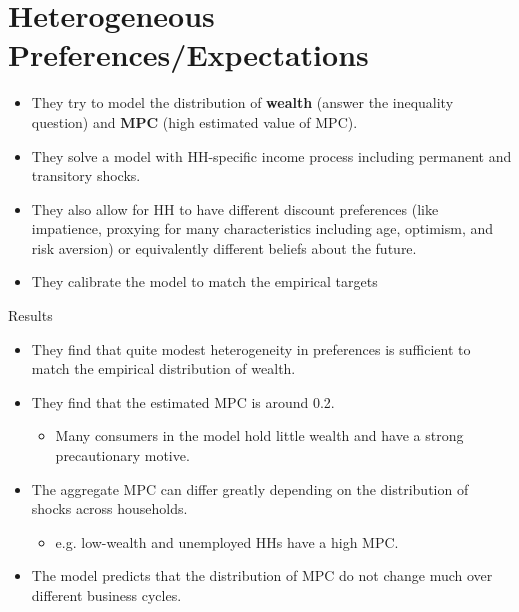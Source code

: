 \documentclass{beamer}
\begin{document}
\section{Heterogeneous Preferences/Expectations}
\begin{frame}{\cite{carroll2017distribution}}
	\begin{itemize}
		\item<1-> They try to model the distribution of \textbf{wealth} (answer the inequality question) and \textbf{MPC} (high estimated value of MPC).
		\item <2-> They solve a model with HH-specific income process including permanent and transitory shocks.
		\item <3-> They also allow for HH to have different discount preferences (like impatience, proxying for many characteristics including age, optimism, and risk aversion) or equivalently different beliefs about the future.
		\item<4->[] They calibrate the model to match the empirical targets
	\end{itemize}
\end{frame}
\begin{frame}{Results}{\citep{carroll2017distribution}}
	\begin{itemize}
		\item <1-> They find that quite modest heterogeneity in preferences is sufficient to match the empirical distribution of wealth.
		\item <2-> They find that the estimated MPC is around 0.2.
		\begin{itemize}
			\item <2-> Many consumers in the model hold little wealth and have a strong precautionary motive.
		\end{itemize}
		\item <3-> The aggregate MPC can differ greatly depending on the distribution of shocks across households.
		\begin{itemize}
			\item <3-> e.g. low-wealth and unemployed HHs have a high MPC.
		\end{itemize}
		\item <4-> The model predicts that the distribution of MPC do not change much over different business cycles.
	\end{itemize}
\end{frame}
\end{document}
